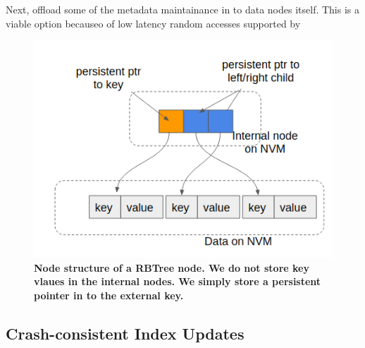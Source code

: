 Next, offload some of the metadata maintainance in to data nodes itself. This is a viable
option becauseo of low latency random accesses supported by




\begin{figure}[]   
	\centering
	\includegraphics[width=\linewidth]{figures/zerocopy.png} 
	\caption{\bf Node structure of a RBTree node. We do not store key vlaues in the internal nodes. We simply
	store a persistent pointer in to the external key.} 
	\label{fig:zerocopy} 
\end{figure}

\subsection{Crash-consistent Index Updates}

\cite{pmwcas}
